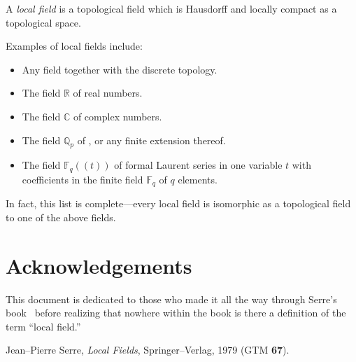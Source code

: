 \documentclass[12pt]{article}
\begin{document}
A {\em local field} is a topological field which is Hausdorff and locally compact as a topological space.

Examples of local fields include:
\begin{itemize}
\item Any field together with the discrete topology.
\item The field $\mathbb{R}$ of real numbers.
\item The field $\mathbb{C}$ of complex numbers.
\item The field $\mathbb{Q}_p$ of , or any finite extension thereof.
\item The field $\mathbb{F}_q((t))$ of formal Laurent series in one variable $t$ with coefficients in the finite field $\mathbb{F}_q$ of $q$ elements.
\end{itemize}
In fact, this list is complete---every local field is isomorphic as a topological field to one of the above fields.

\section{Acknowledgements}

This document is dedicated to those who made it all the way through Serre's book~\cite{serre} before realizing that nowhere within the book is there a definition of the term ``local field.''

\begin{thebibliography}{9}
 Jean--Pierre Serre, {\em Local Fields}, Springer--Verlag, 1979 (GTM {\bf 67}).
\end{thebibliography}
\end{document}
